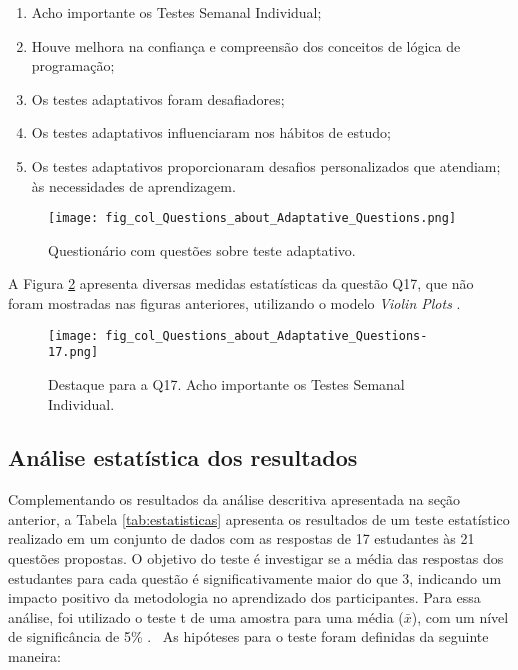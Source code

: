 \begin{enumerate}[label=\textbf{Q\arabic*.}, itemsep=0pt, parsep=0pt, topsep=0pt, leftmargin=*, before=\ttfamily, after=\normalfont]
    \fontsize{9}{11}\selectfont
    \setcounter{enumi}{16} %
    \item Acho importante os Testes Semanal Individual;
    \item Houve melhora na confiança e compreensão dos conceitos de lógica de programação;
    \item Os testes adaptativos foram desafiadores;
    \item Os testes adaptativos influenciaram nos hábitos de estudo;
    \item Os testes adaptativos proporcionaram desafios personalizados que atendiam; às necessidades de a\-prendizagem.
\end{enumerate}

\begin{figure}[!ht]
    \centering
    \texttt{[image: fig\_col\_Questions\_about\_Adaptative\_Questions.png]}
     \caption{Questionário com questões sobre teste adaptativo.}
  \label{fig:fig_col_Questions_about_Adaptative_Questions}
\end{figure}

A Figura \ref{fig:fig_col_Questions_about_Adaptative_Questions-17} apresenta diversas medidas estatísticas da questão Q17, que não foram mostradas nas figuras anteriores, utilizando o modelo \textit{Violin Plots} \cite{hintze1998violin}.

\begin{figure}[!ht]
    \centering
    \texttt{[image: fig\_col\_Questions\_about\_Adaptative\_Questions-17.png]}
     \caption{Destaque para a Q17. Acho importante os Testes Semanal Individual.}
  \label{fig:fig_col_Questions_about_Adaptative_Questions-17}
\end{figure}

\subsection{Análise estatística dos resultados}

Complementando os resultados da análise descritiva apresentada na seção anterior, a Tabela \ref{tab:estatisticas} apresenta os resultados de um teste estatístico realizado em um conjunto de dados com as respostas de 17 estudantes às 21 questões propostas. O objetivo do teste é investigar se a média das respostas dos estudantes para cada questão é significativamente maior do que 3, indicando um impacto positivo da metodologia no aprendizado dos participantes. Para essa análise, foi utilizado o teste t de uma amostra para uma média (\(\bar{x}\)), com um nível de significância de 5\% \cite{lowry2014concepts}.
\
As hipóteses para o teste foram definidas da seguinte maneira:


